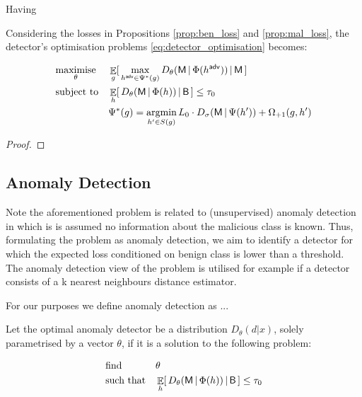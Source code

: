 Having

\begin{proposition}
    Considering the losses in Propositions \ref{prop:ben_loss} and \ref{prop:mal_loss}, the detector's optimisation problems \ref{eq:detector_optimisation} becomes:

    \begin{equation*}
        \begin{aligned}
        & \underset{\theta} {\text{maximise}}
        & & \mathop{\mathbb{E}}_g [\, \max_{h^{\mathsf{adv}} \in \Psi^*(g)} D_\theta(\mathsf{M} \,|\, \Phi (h^{\mathsf{adv}})) \,|\, \mathsf{M} \,] \\
        & \text{subject to}
        & & \mathop{\mathbb{E}}_{h} [\, D_\theta(\mathsf{M} \,|\, \Phi (h)) \,|\, \mathsf{B} \,] \le \tau_0 \\
        & & & \Psi^*(g) = \mathop{\text{argmin}}_{h' \in S(g)} L_0 \cdot D_\sigma(\mathsf{M} \,|\, \Psi(h')) + \Omega_{{\text{+}1}}(g, h')
        \end{aligned}
    \end{equation*}
\end{proposition}

\begin{proof}
\end{proof}

\subsection{Anomaly Detection}
Note the aforementioned problem is related to (unsupervised) anomaly detection in which is is assumed no information about the malicious class is known. Thus, formulating the problem as anomaly detection, we aim to identify a detector for which the expected loss conditioned on benign class is lower than a threshold. The anomaly detection view of the problem is utilised for example if a detector consists of a k nearest neighbours distance estimator.

For our purposes we define anomaly detection as ...

\begin{definition}\label{def:anomaly_detection}
    Let the optimal anomaly detector be a distribution $D_\theta(d | x)$, solely parametrised by a vector $\theta$, if it is a solution to the following problem:

    \begin{equation}
        \begin{aligned}
        & \text{find}
        & & \theta \\
        & \text{such that}
        & & \mathop{\mathbb{E}}_h [\, D_\theta(\mathsf{M} \,|\, \Phi(h)) \,|\, \mathsf{B} \,] \leq \tau_0 \\
        \end{aligned}
    \end{equation}
\end{definition}
